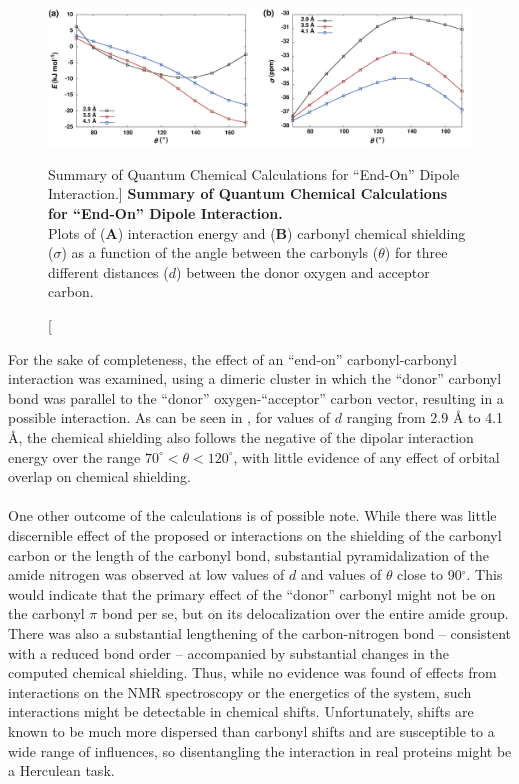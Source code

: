 \begin{figure}[h!]
\includegraphics[width=6in]{figs/npistar/09-curves.png}
\caption
  [Summary of Quantum Chemical Calculations for ``End-On'' Dipole Interaction.]
  {{\bf
   Summary of Quantum Chemical Calculations for ``End-On'' Dipole Interaction.
  }
  \\
  Plots of ({\bf A}) interaction energy and ({\bf B}) carbonyl \cnmr{} chemical
  shielding ($\sigma$) as a function of the angle between the carbonyls
  ($\theta$) for three different distances ($d$) between the donor oxygen
  and acceptor carbon.
}
\label{figure.11.9}
\end{figure}

\begin{doublespace}
For the sake of completeness, the effect of an ``end-on'' carbonyl-carbonyl
interaction was examined, using a dimeric cluster in which the ``donor''
carbonyl bond was parallel to the ``donor'' oxygen-``acceptor'' carbon vector,
resulting in a possible \nspistar{} interaction. As can be seen in
, for values of $d$ ranging
from 2.9 \r{A} to 4.1 \r{A}, the chemical shielding also follows
the negative of the dipolar interaction energy over the range
$70^\circ < \theta < 120^\circ$, with little evidence of any
effect of orbital overlap on chemical shielding.
\\\\
One other outcome of the calculations is of possible note. While there was
little discernible effect of the proposed \nspistar{} or \npipistar{}
interactions on the shielding of the carbonyl carbon or the length of the
carbonyl bond, substantial pyramidalization of the amide nitrogen was observed
at low values of $d$ and values of $\theta$ close to 90$^\circ$. This would
indicate that the primary effect of the ``donor'' carbonyl might not be on the
carbonyl $\pi$ bond per se, but on its delocalization over the entire
amide group. There was also a substantial lengthening of the carbon-nitrogen
bond -- consistent with a reduced bond order -- accompanied by substantial
changes in the computed \nnmr{} chemical shielding. Thus, while no evidence
was found of effects from \nspistar{} interactions on the \cnmr{} NMR
spectroscopy or the energetics of the system, such interactions might be
detectable in \nnmr{} chemical shifts. Unfortunately, \nnmr{} shifts are known
to be much more dispersed than carbonyl \cnmr{} shifts and are susceptible to
a wide range of influences, so disentangling the interaction in real proteins
might be a Herculean task.
\end{doublespace}

